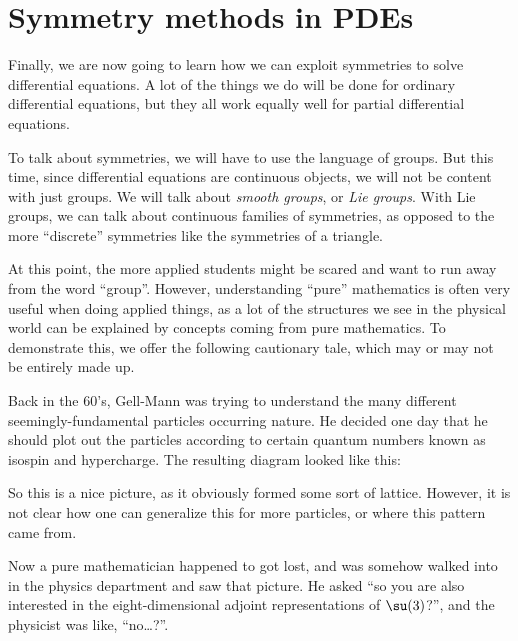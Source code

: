 \documentclass[a4paper]{article}
\begin{document}
\section{Symmetry methods in PDEs}
Finally, we are now going to learn how we can exploit symmetries to solve differential equations. A lot of the things we do will be done for ordinary differential equations, but they all work equally well for partial differential equations.

To talk about symmetries, we will have to use the language of groups. But this time, since differential equations are continuous objects, we will not be content with just groups. We will talk about \emph{smooth groups}, or \emph{Lie groups}. With Lie groups, we can talk about continuous families of symmetries, as opposed to the more ``discrete'' symmetries like the symmetries of a triangle.

At this point, the more applied students might be scared and want to run away from the word ``group''. However, understanding ``pure'' mathematics is often very useful when doing applied things, as a lot of the structures we see in the physical world can be explained by concepts coming from pure mathematics. To demonstrate this, we offer the following cautionary tale, which may or may not be entirely made up.

Back in the 60's, Gell-Mann was trying to understand the many different seemingly-fundamental particles occurring nature. He decided one day that he should plot out the particles according to certain quantum numbers known as isospin and hypercharge. The resulting diagram looked like this:
\begin{center}
\end{center}
So this is a nice picture, as it obviously formed some sort of lattice. However, it is not clear how one can generalize this for more particles, or where this pattern came from.

Now a pure mathematician happened to got lost, and was somehow walked into in the physics department and saw that picture. He asked ``so you are also interested in the eight-dimensional adjoint representations of $\su(3)$?'', and the physicist was like, ``no\ldots?''.
\end{document}
